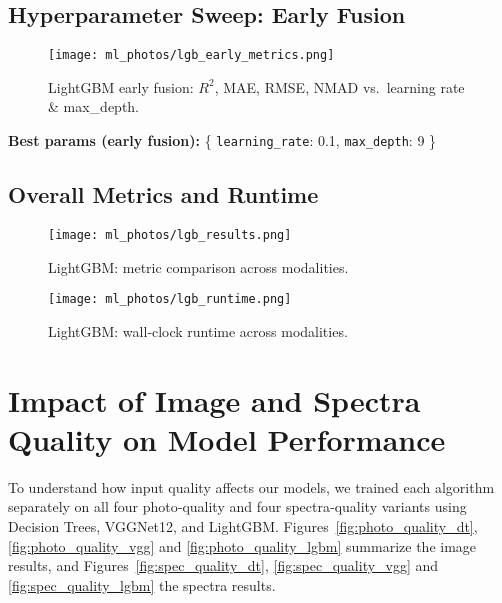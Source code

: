 \documentclass[english,bachelor,oneside]{ctufit-thesis}
\begin{document}
\subsection{Hyperparameter Sweep: Early Fusion}
\begin{figure}[H]
  \centering
  \texttt{[image: ml\_photos/lgb\_early\_metrics.png]}
  \caption{LightGBM early fusion: $R^2$, MAE, RMSE, NMAD vs.\ learning rate \& max\_depth.}
  \label{fig:lgb_early_metrics}
\end{figure}
\noindent\textbf{Best params (early fusion):} \{ \texttt{learning\_rate}: 0.1, \texttt{max\_depth}: 9 \}\\

\subsection{Overall Metrics and Runtime}
\begin{figure}[H]
  \centering
  \texttt{[image: ml\_photos/lgb\_results.png]}
  \caption{LightGBM: metric comparison across modalities.}
  \label{fig:lgb_results}
\end{figure}

\begin{figure}[H]
  \centering
  \texttt{[image: ml\_photos/lgb\_runtime.png]}
  \caption{LightGBM: wall‐clock runtime across modalities.}
  \label{fig:lgb_runtime}
\end{figure}

\section{Impact of Image and Spectra Quality on Model Performance}
To understand how input quality affects our models, we trained each algorithm separately on all four photo‐quality and four spectra‐quality variants using Decision Trees, VGGNet12, and LightGBM. Figures~\ref{fig:photo_quality_dt}, \ref{fig:photo_quality_vgg} and \ref{fig:photo_quality_lgbm} summarize the image results, and Figures~\ref{fig:spec_quality_dt}, \ref{fig:spec_quality_vgg} and \ref{fig:spec_quality_lgbm} the spectra results.
\end{document}

